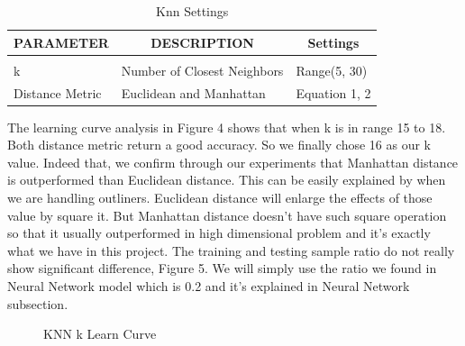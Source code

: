 \documentclass{article} %
\begin{document}
\begin{table}[H]
\caption{Knn Settings}
\begin{center}
\begin{tabular}{lll}
\multicolumn{1}{c}{\bf PARAMETER}  &\multicolumn{1}{c}{\bf DESCRIPTION}  &\multicolumn{1}{c}{\bf Settings}
\\ \hline \\
k          & Number of Closest Neighbors & Range(5, 30) \\
Distance Metric   & Euclidean and Manhattan &Equation 1, 2 \\
\end{tabular}
\end{center}
\end{table}

The learning curve analysis in Figure 4 shows that when k is in range 15 to 18. Both distance metric return a good accuracy. So we finally chose 16 as our k value. Indeed that, we confirm through our experiments that Manhattan distance is outperformed than Euclidean distance. This can be easily explained by when we are handling outliners. Euclidean distance will enlarge the effects of those value by square it. But Manhattan distance doesn't have such square operation so that it usually outperformed in high dimensional problem and it's exactly what we have in this project. The training and testing sample ratio do not really show significant difference, Figure 5. We will simply use the ratio we found in Neural Network model which is 0.2 and it's explained in Neural Network subsection. 

\begin{figure}[H]
\begin{center}
\caption{KNN k Learn Curve}
\end{center}
\end{figure}
\end{document}
